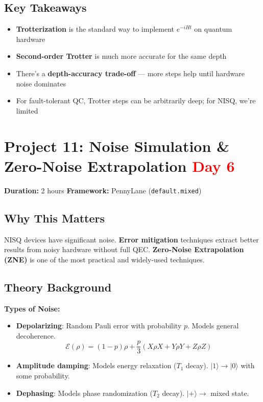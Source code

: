 \documentclass[11pt,a4paper]{article}
\begin{document}
\subsection*{Key Takeaways}
\begin{itemize}
    \item \textbf{Trotterization} is the standard way to implement $e^{-iHt}$ on quantum hardware
    \item \textbf{Second-order Trotter} is much more accurate for the same depth
    \item There's a \textbf{depth-accuracy trade-off} --- more steps help until hardware noise dominates
    \item For fault-tolerant QC, Trotter steps can be arbitrarily deep; for NISQ, we're limited
\end{itemize}


\section{Project 11: Noise Simulation \& Zero-Noise Extrapolation \hfill \textcolor{red}{\textbf{Day 6}}}

\begin{questionbox}
\textbf{Duration:} 2 hours \quad \textbf{Framework:} PennyLane (\texttt{default.mixed})
\end{questionbox}

\subsection*{Why This Matters}
NISQ devices have significant noise. \textbf{Error mitigation} techniques extract better results from noisy hardware without full QEC. \textbf{Zero-Noise Extrapolation (ZNE)} is one of the most practical and widely-used techniques.

\subsection*{Theory Background}
\textbf{Types of Noise:}
\begin{itemize}
    \item \textbf{Depolarizing}: Random Pauli error with probability $p$. Models general decoherence.
    \[
    \mathcal{E}(\rho) = (1-p)\rho + \frac{p}{3}(X\rho X + Y\rho Y + Z\rho Z)
    \]
    \item \textbf{Amplitude damping}: Models energy relaxation ($T_1$ decay). $|1\rangle \to |0\rangle$ with some probability.
    \item \textbf{Dephasing}: Models phase randomization ($T_2$ decay). $|+\rangle \to $ mixed state.
\end{itemize}
\end{document}

